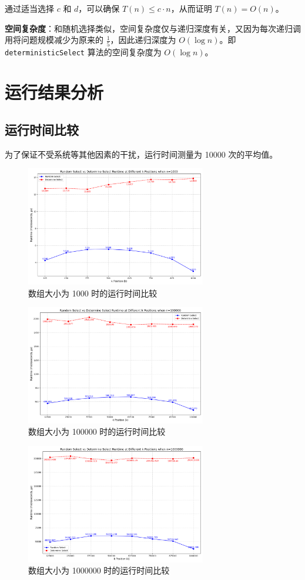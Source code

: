 通过适当选择 \( c \) 和 \( d \)，可以确保 \( T(n) \leq c \cdot n \)，从而证明 \( T(n) = O(n) \)。

\textbf{空间复杂度}：和随机选择类似，空间复杂度仅与递归深度有关，又因为每次递归调用将问题规模减少为原来的 $\frac{1}{5}$，因此递归深度为 \( O(\log n) \)。即 \texttt{deterministicSelect} 算法的空间复杂度为 \( O(\log n) \)。

\section{运行结果分析}
\subsection{运行时间比较}
为了保证不受系统等其他因素的干扰，运行时间测量为 10000 次的平均值。
\begin{figure}[H]
    \centering
    \includegraphics[width=0.7\textwidth]{../figure/1000.png}
    \caption{数组大小为 1000 时的运行时间比较}
\end{figure}
\begin{figure}[H]
    \centering
    \includegraphics[width=0.7\textwidth]{../figure/100000.png}
    \caption{数组大小为 100000 时的运行时间比较}
\end{figure}
\begin{figure}[H]
    \centering
    \includegraphics[width=0.7\textwidth]{../figure/1000000.png}
    \caption{数组大小为 1000000 时的运行时间比较}
\end{figure}
